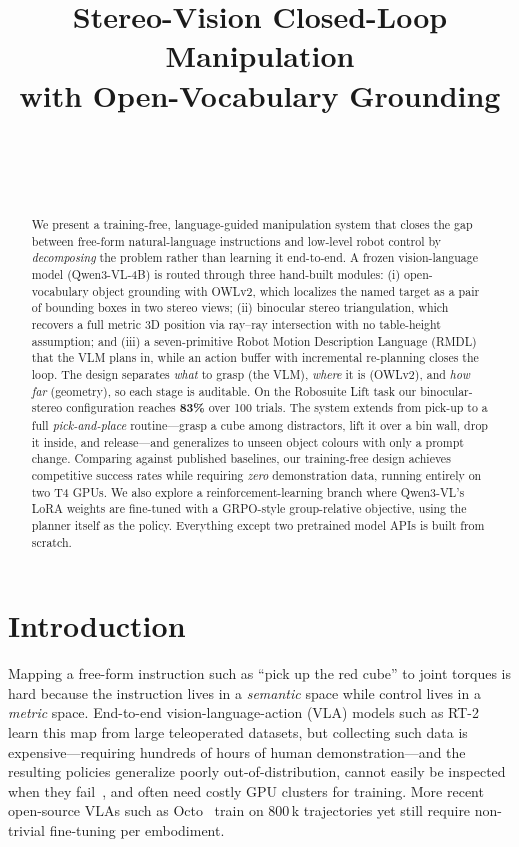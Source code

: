 \documentclass[conference]{IEEEtran}
\title{Stereo-Vision Closed-Loop Manipulation\\ with Open-Vocabulary Grounding}
\author{%
  \authorblockN{Yingjun.~Lan,~~Jinhao.~Zhang,~~Zhengxiang.~Liu}\\
  \authorblockA{School of Artificial Intelligence, Shanghai Jiao Tong University}\\
  \authorblockA{\scriptsize\texttt{winjayran,zhangjinhao,2312471604@sjtu.edu.cn}}\\
  \authorblockA{\scriptsize\href{https://github.com/winjayran/StereoVisionDSLRobot}{Project: winjayran/StereoVisionDSLRobot}} 
}
\begin{document}
\maketitle

\begin{abstract}
We present a training-free, language-guided manipulation system that closes the gap between free-form natural-language instructions and low-level robot control by \emph{decomposing} the problem rather than learning it end-to-end. A frozen vision-language model (Qwen3-VL-4B) is routed through three hand-built modules: (i) open-vocabulary object grounding with OWLv2, which localizes the named target as a pair of bounding boxes in two stereo views; (ii) binocular stereo triangulation, which recovers a full metric 3D position via ray--ray intersection with no table-height assumption; and (iii) a seven-primitive Robot Motion Description Language (RMDL) that the VLM plans in, while an action buffer with incremental re-planning closes the loop. The design separates \emph{what} to grasp (the VLM), \emph{where} it is (OWLv2), and \emph{how far} (geometry), so each stage is auditable. On the Robosuite Lift task our binocular-stereo configuration reaches \textbf{83\%} over 100 trials. The system extends from pick-up to a full \emph{pick-and-place} routine---grasp a cube among distractors, lift it over a bin wall, drop it inside, and release---and generalizes to unseen object colours with only a prompt change. Comparing against published baselines, our training-free design achieves competitive success rates while requiring \emph{zero} demonstration data, running entirely on %
two T4 GPUs. We also explore a reinforcement-learning branch where Qwen3-VL's LoRA weights are fine-tuned with a GRPO-style group-relative objective, using the planner itself as the policy. Everything except two pretrained model APIs is built from scratch.
\end{abstract}

\section{Introduction}
\label{sec:intro}

Mapping a free-form instruction such as ``pick up the red cube'' to joint torques is hard because the instruction lives in a \emph{semantic} space while control lives in a \emph{metric} space. End-to-end vision-language-action (VLA) models such as RT-2~\cite{rt2} learn this map from large teleoperated datasets, but collecting such data is expensive---requiring hundreds of hours of human demonstration---and the resulting policies generalize poorly out-of-distribution, cannot easily be inspected when they fail~\cite{robomimic}, and often need costly GPU clusters for training. More recent open-source VLAs such as Octo~\cite{octo} train on 800\,k trajectories yet still require non-trivial fine-tuning per embodiment.
\end{document}
